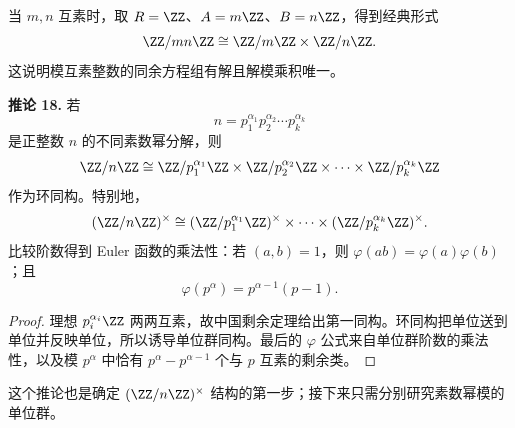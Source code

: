 当 $m,n$ 互素时，取 $R=\ZZ$、$A=m\ZZ$、$B=n\ZZ$，得到经典形式
\[
  \ZZ/mn\ZZ\cong \ZZ/m\ZZ\times\ZZ/n\ZZ.
\]
这说明模互素整数的同余方程组有解且解模乘积唯一。

\medskip
\noindent\textbf{推论 18.} 若
\[
  n=p_1^{\alpha_1}p_2^{\alpha_2}\cdots p_k^{\alpha_k}
\]
是正整数 $n$ 的不同素数幂分解，则
\[
  \ZZ/n\ZZ
  \cong
  \ZZ/p_1^{\alpha_1}\ZZ\times\ZZ/p_2^{\alpha_2}\ZZ\times\cdots\times
  \ZZ/p_k^{\alpha_k}\ZZ
\]
作为环同构。特别地，
\[
  (\ZZ/n\ZZ)^\times
  \cong
  (\ZZ/p_1^{\alpha_1}\ZZ)^\times\times\cdots\times
  (\ZZ/p_k^{\alpha_k}\ZZ)^\times.
\]
比较阶数得到 Euler 函数的乘法性：若 $(a,b)=1$，则 $\varphi(ab)=\varphi(a)\varphi(b)$；且
\[
  \varphi(p^\alpha)=p^{\alpha-1}(p-1).
\]

\begin{proof}
理想 $p_i^{\alpha_i}\ZZ$ 两两互素，故中国剩余定理给出第一同构。环同构把单位送到单位并反映单位，所以诱导单位群同构。最后的 $\varphi$ 公式来自单位群阶数的乘法性，以及模 $p^\alpha$ 中恰有 $p^\alpha-p^{\alpha-1}$ 个与 $p$ 互素的剩余类。
\end{proof}

这个推论也是确定 $(\ZZ/n\ZZ)^\times$ 结构的第一步；接下来只需分别研究素数幂模的单位群。

